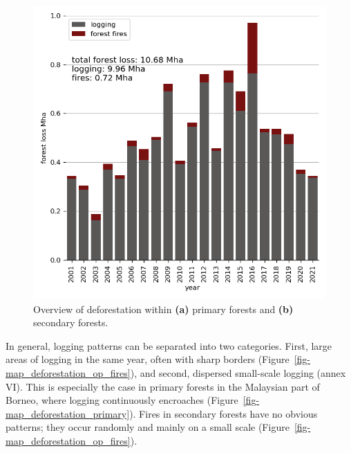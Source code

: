\documentclass[
  letterpaper,
  DIV=11,
  numbers=noendperiod]{scrreprt}
\begin{document}
\begin{figure}
\begin{minipage}[t]{0.49\linewidth}
{{\includegraphics{text/../code/results/final_plots/total_deforestation.png}

}

}

\end{minipage}%

\caption{\label{fig-forestlossbarcharts}Overview of deforestation within
\textbf{(a)} primary forests and \textbf{(b)} secondary forests.}

\end{figure}

In general, logging patterns can be separated into two categories.
First, large areas of logging in the same year, often with sharp borders
(Figure~\ref{fig-map_deforestation_op_fires}), and second, dispersed
small-scale logging (annex VI). This is especially the case in primary
forests in the Malaysian part of Borneo, where logging continuously
encroaches (Figure~\ref{fig-map_deforestation_primary}). Fires in
secondary forests have no obvious patterns; they occur randomly and
mainly on a small scale (Figure~\ref{fig-map_deforestation_op_fires}).
\end{document}
